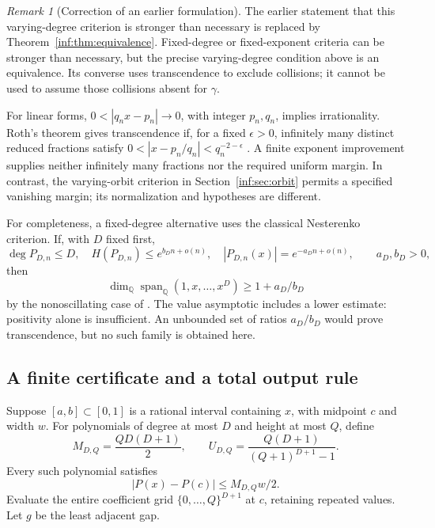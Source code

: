 \documentclass[11pt,a4paper]{article}
\newcommand{\Q}{\mathbb Q}
\theoremstyle{definition}
\theoremstyle{remark}
\newtheorem{remark}[theorem]{Remark}
\numberwithin{equation}{section}
\begin{document}
\begin{remark}[Correction of an earlier formulation]
The earlier statement that this varying-degree criterion is stronger than necessary is replaced by Theorem~\ref{inf:thm:equivalence}. Fixed-degree or fixed-exponent criteria can be stronger than necessary, but the precise varying-degree condition above is an equivalence. Its converse uses transcendence to exclude collisions; it cannot be used to assume those collisions absent for $\gamma$.
\end{remark}

For linear forms, $0<|q_nx-p_n|\to0$, with integer $p_n,q_n$, implies irrationality. Roth's theorem gives transcendence if, for a fixed $\epsilon>0$, infinitely many distinct reduced fractions satisfy $0<|x-p_n/q_n|<q_n^{-2-\epsilon}$ \cite{pm:Roth1955}. A finite exponent improvement supplies neither infinitely many fractions nor the required uniform margin. In contrast, the varying-orbit criterion in Section~\ref{inf:sec:orbit} permits a specified vanishing margin; its normalization and hypotheses are different.

For completeness, a fixed-degree alternative uses the classical Nesterenko criterion. If, with $D$ fixed first,
\[
 \deg P_{D,n}\le D,\quad H(P_{D,n})\le e^{b_Dn+o(n)},\quad
 |P_{D,n}(x)|=e^{-a_Dn+o(n)},\qquad a_D,b_D>0,
\]
then
\[
 \dim_\Q\operatorname{span}_\Q(1,x,\ldots,x^D)\ge1+a_D/b_D
\]
by the nonoscillating case of \cite[Theorem 1]{inf:FischlerOsc}. The value asymptotic includes a lower estimate: positivity alone is insufficient. An unbounded set of ratios $a_D/b_D$ would prove transcendence, but no such family is obtained here.

\subsection{A finite certificate and a total output rule}
\label{inf:sub:canonical}
Suppose $[a,b]\subset[0,1]$ is a rational interval containing $x$, with midpoint $c$ and width $w$. For polynomials of degree at most $D$ and height at most $Q$, define
\[
 M_{D,Q}=\frac{QD(D+1)}2,
 \qquad U_{D,Q}=\frac{Q(D+1)}{(Q+1)^{D+1}-1}.
\]
Every such polynomial satisfies
\begin{equation}\label{inf:eq:derivative-budget}
 |P(x)-P(c)|\le M_{D,Q}w/2.
\end{equation}
Evaluate the entire coefficient grid $\{0,\ldots,Q\}^{D+1}$ at $c$, retaining repeated values. Let $g$ be the least adjacent gap.
\end{document}

